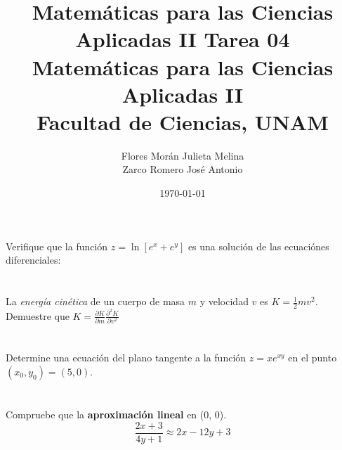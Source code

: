 \documentclass[12pt]{article}
\title{Matemáticas para las Ciencias Aplicadas II}
\title{
        \textbf{Tarea 04} \\
        \vspace{1ex}
        \large Matemáticas para las Ciencias Aplicadas II \\
        Facultad de Ciencias, UNAM}
\date{\today}
\author{Flores Morán Julieta Melina \\ Zarco Romero José Antonio}
\begin{document}
\maketitle

\section{}
Verifique que la función $z = \ln{[e^x + e^y]}$ es una solución de las ecuaciónes diferenciales:


\section{}

La \textit{energía cinética} de un cuerpo de masa $m$ y velocidad $v$ es $K = mv^2$. Demuestre que $K= $

\section{}

Determine una ecuación del plano tangente a la función $z = xe^{xy}$ en el punto $(x_0, y_0) = (5, 0)$.

\section{}

Compruebe que la \textbf{aproximación lineal} en (0, 0).
$$\frac{2x+3}{4y +1} \approx 2x - 12y + 3$$
\end{document}
